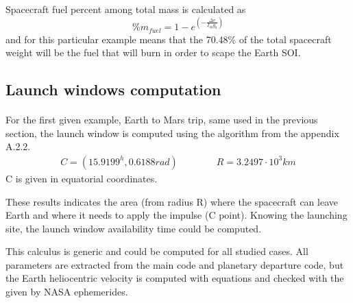 	Spacecraft fuel percent among total mass is calculated as
	\begin{equation}
		\%m_{fuel} = 1-e^{(-\frac{\Delta v}{I_{sp}g_0})}
	\end{equation}
	and for this particular example means that the 70.48\% of the total spacecraft weight will be the fuel that will burn in order to scape the Earth SOI.
	\subsection{Launch windows computation}
\paragraph{}	For the first given example, Earth to Mars trip, same used in the previous section, the launch window is computed using the algorithm from the appendix A.2.2.
\begin{align*}
	C=(15.9199^h, 0.6188rad)  \qquad \qquad R=3.2497\cdot10^3 km
\end{align*}
C is given in equatorial coordinates.

These results indicates the area (from radius R) where the spacecraft can leave Earth and where it needs to apply the impulse (C point). Knowing the launching site, the launch window availability time could be computed. 

This calculus is generic and could be computed for all studied cases. All parameters are extracted from the main code and planetary departure code, but the Earth heliocentric velocity is computed with \cite{llibreVictor} equations and checked with the given by NASA ephemerides.


	